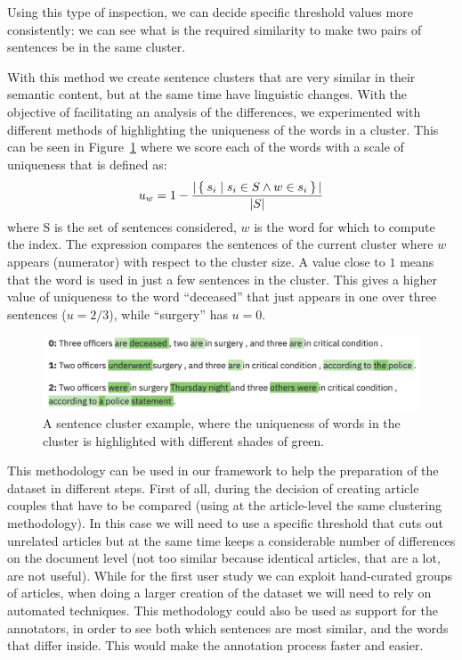 Using this type of inspection, we can decide specific threshold values more consistently: we can see what is the required similarity to make two pairs of sentences be in the same cluster.

With this method we create sentence clusters that are very similar in their semantic content, but at the same time have linguistic changes.
With the objective of facilitating an analysis of the differences, we experimented with different methods of highlighting the uniqueness of the words in a cluster.
This can be seen in Figure~\ref{fig:words_uniqueness} where we score each of the words with a scale of uniqueness that is defined as:
$$u_w = 1 - \frac{|\Set{s_i | s_i \in S \land w \in s_i}|}{|S|}$$
where S is the set of sentences considered, $w$ is the word for which to compute the index. The expression compares the sentences of the current cluster where $w$ appears (numerator) with respect to the cluster size.
A value close to $1$ means that the word is used in just a few sentences in the cluster.
This gives a higher value of uniqueness to the word ``deceased'' that just appears in one over three sentences ($u = 2/3$), while ``surgery'' has $u = 0$.

\begin{figure}[!htb]
    \centering
    \includegraphics[width=\textwidth]{figures/words_uniqueness.png}
    \caption{A sentence cluster example, where the uniqueness of words in the cluster is highlighted with different shades of green.}
    \label{fig:words_uniqueness}
\end{figure}



This methodology can be used in our framework to help the preparation of the dataset in different steps.
First of all, during the decision of creating article couples that have to be compared (using at the article-level the same clustering methodology). In this case we will need to use a specific threshold that cuts out unrelated articles but at the same time keeps a considerable number of differences on the document level (not too similar because identical articles, that are a lot, are not useful).
While for the first user study we can exploit hand-curated groups of articles, when doing a larger creation of the dataset we will need to rely on automated techniques.
This methodology could also be used as support for the annotators, in order to see both which sentences are most similar, and the words that differ inside. This would make the annotation process faster and easier.

